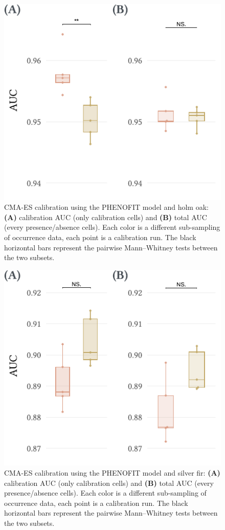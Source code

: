 \begin{figure}[H]
\centering 
\includegraphics{chapter1/figs/supp/calibCMAESquercus} 
\caption{CMA-ES calibration using the PHENOFIT model and holm oak: \textbf{(A)} calibration AUC (only calibration cells) and \textbf{(B)} total AUC (every presence/absence cells). Each color is a different sub-sampling of occurrence data, each point is a calibration run. The black horizontal bars represent the pairwise Mann–Whitney tests between the two subsets.}\label{fig:calibCMAESquercus}
\end{figure}

\begin{figure}[H]
\centering 
\includegraphics{chapter1/figs/supp/calibCMAESabies} 
\caption{CMA-ES calibration using the PHENOFIT model and silver fir: \textbf{(A)} calibration AUC (only calibration cells) and \textbf{(B)} total AUC (every presence/absence cells). Each color is a different sub-sampling of occurrence data, each point is a calibration run. The black horizontal bars represent the pairwise Mann–Whitney tests between the two subsets.}\label{fig:calibCMAESabies}
\end{figure}

